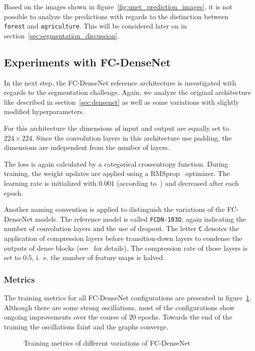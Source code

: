 Based on the images shown in figure~\ref{fig:unet_prediction_images}, it is not possible to analyze the predictions with regards to the distinction between \texttt{forest} and \texttt{agriculture}. This will be considered later on in section~\ref{sec:segmentation_discussion}.

\subsection{Experiments with FC-DenseNet}
\label{sec:densenet_experiments}
In the next step, the FC-DenseNet reference architecture is investigated with regards to the segmentation challenge. Again, we analyze the original architecture like described in section~\ref{sec:densenet} as well as some variations with slightly modified hyperparameters.

For this architecture the dimensions of input and output are equally set to $224\times 224$. Since the convolution layers in this architecture use padding, the dimensions are independent from the number of layers.

The loss is again calculated by a categorical crossentropy function. During training, the weight updates are applied using a RMSprop~\cite{rmsprop14} optimizer. The learning rate is initialized with $0.001$ (according to~\cite{denseseg17}) and decreased after each epoch.

Another naming convention is applied to distinguish the variations of the FC-DenseNet models. The reference model is called \texttt{FCDN-103D}, again indicating the number of convolution layers and the use of dropout. The letter \texttt{C} denotes the application of compression layers before transition-down layers to condense the outputs of dense blocks (see~\cite{denseseg17} for details). The compression rate of those layers is set to $0.5$, i.~e. the number of feature maps is halved.

\subsubsection{Metrics}
The training metrics for all FC-DenseNet configurations are presented in figure~\ref{fig:densenet_train_metrics}. Although there are some strong oscillations, most of the configurations show ongoing improvements over the course of 20 epochs. Towards the end of the training the oscillations faint and the graphs converge.

\begin{figure}
    \newcommand{\DensenetMetricsImageWidth}{0.32\textwidth}
    \centering
            
    \caption{Training metrics of different variations of FC-DenseNet}
    \label{fig:densenet_train_metrics}
\end{figure}

